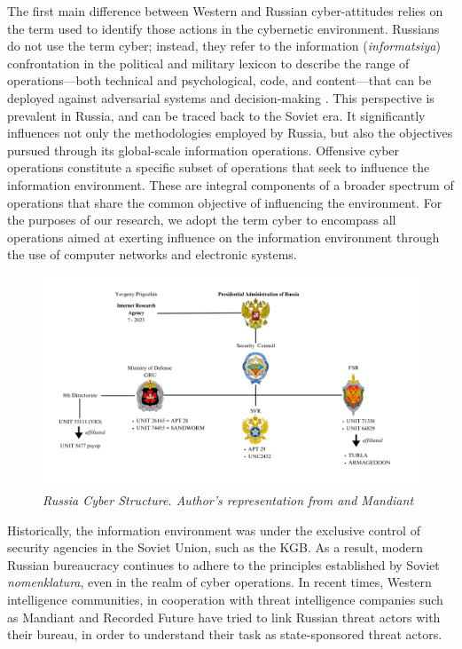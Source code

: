 The first main difference between Western and Russian cyber-attitudes relies on the term used to identify those actions in the cybernetic environment. Russians do not use the term cyber; instead, they refer to the information (\textit{informatsiya}) confrontation in the political and military lexicon to describe the range of operations—both technical and psychological, code, and content—that can be deployed against adversarial systems and decision-making \autocite[3]{wilde_2022_cyber}. This perspective is prevalent in Russia, and can be traced back to the Soviet era. It significantly influences not only the methodologies employed by Russia, but also the objectives pursued through its global-scale information operations. Offensive cyber operations constitute a specific subset of operations that seek to influence the information environment. These are integral components of a broader spectrum of operations that share the common objective of influencing the environment. For the purposes of our research, we adopt the term cyber to encompass all operations aimed at exerting influence on the information environment through the use of computer networks and electronic systems.

\begin{figure}[H]
\centering
\includegraphics[width=1\textwidth]{Images/RussiaCyber.png}
\caption{\textit{Russia Cyber Structure. Author's representation from \textcite{wilde_2022_cyber} and Mandiant}}
\label{RussiaCyber.png}
\end{figure}

Historically, the information environment was under the exclusive control of security agencies in the Soviet Union, such as the KGB. As a result, modern Russian bureaucracy continues to adhere to the principles established by Soviet \textit{nomenklatura}, even in the realm of cyber operations. In recent times, Western intelligence communities, in cooperation with threat intelligence companies such as Mandiant and Recorded Future have tried to link Russian threat actors with their bureau, in order to understand their task as state-sponsored threat actors. 

